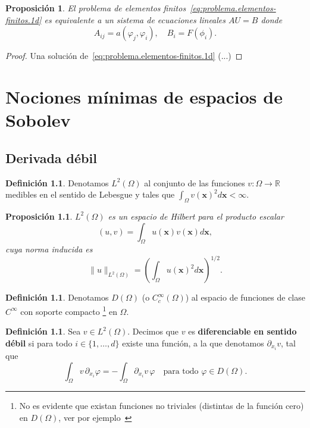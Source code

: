 \documentclass[11pt]{report}
\theoremstyle{plain}
\newtheorem{proposition}[theorem]{Proposición}
\theoremstyle{definition}
\newtheorem{definition}[theorem]{Definición}
\newcommand{\R}{\ensuremath{\mathbb{R}}}
\newcommand{\xx}{\ensuremath{\mathbf{x}}\xspace}
\begin{document}
\begin{proposition}
El problema de elementos finitos~\eqref{eq:problema.elementos-finitos.1d} es equivalente a un sistema de ecuaciones lineales $AU=B$ donde
\[
  A_{ij}=a(\varphi_j,\varphi_i), \quad B_i=F(\phi_i).
\]
\end{proposition}

\begin{proof}
 Una solución de~\eqref{eq:problema.elementos-finitos.1d}  (...)
\end{proof}




\chapter{Nociones mínimas de espacios de Sobolev}

\section{Derivada débil}
\begin{definition}
Denotamos $L^2(\Omega)$ al conjunto de las funciones $v:\Omega\to\R$  medibles en el sentido de Lebesgue y tales que $\int_\Omega v(\xx)^2 d\xx<\infty$.
\end{definition}

\begin{proposition}
   $L^2(\Omega)$ es un espacio de Hilbert para el producto escalar
  \begin{equation}
    \label{eq:producto.escalar.L2}
    (u, v) = \int_\Omega u(\xx) v(\xx) d\xx,
  \end{equation}
  cuya norma inducida es
  \begin{equation}
    \label{eq:norma.L2}
    \|u\|_{L^2(\Omega)} = \left(\int_\Omega u(\xx)^2 d\xx \right)^{1/2}.
  \end{equation}
\end{proposition}

\begin{definition}
  Denotamos $D(\Omega)$ (o $C^\infty_c(\Omega)$) al espacio de funciones de clase $C^\infty$ con soporte compacto%
  \footnote{No es evidente que existan funciones no triviales (distintas de la función cero) en $D(\Omega)$, ver por ejemplo~\cite{brezis:2017}}
  en $\Omega$.
\end{definition}

\begin{definition}
  Sea $v\in L^2(\Omega)$. Decimos que $v$ es \textbf{diferenciable en sentido débil} si para todo $i\in\{1,\dots,d\}$ existe una función, a la que denotamos $\partial_{x_i} v$, tal que 
  \begin{displaymath}
    \int_\Omega v\, \partial_{x_i} \varphi  = - \int_\Omega \partial_{x_i} v \, \varphi \quad \text{para todo } \varphi\in D(\Omega).
  \end{displaymath}
\end{definition}
\end{document}
